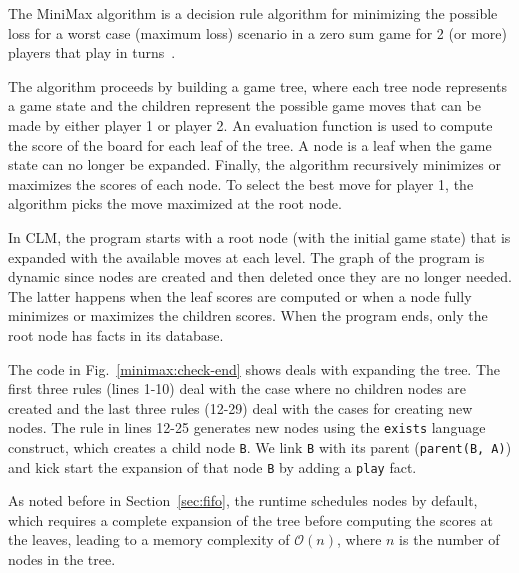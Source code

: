 The MiniMax algorithm is a decision rule algorithm for minimizing the
possible loss for a worst case (maximum loss) scenario in a zero sum
game for 2 (or more) players that play in
turns~\cite{Edwards54}.

The algorithm proceeds by building a game tree, where each tree node represents a
game state and the children represent the possible game moves that can
be made by either player 1 or player 2.
An evaluation function is used to compute the score of
the board for each leaf of the tree. A node is a leaf when the game state can no longer be
expanded. Finally, the
algorithm recursively minimizes or maximizes the scores of each node.
To select the best move for player 1, the
algorithm picks the move maximized at the root node.

In CLM, the program starts with a root node (with the initial game state)
that is expanded with the available moves at each level. The graph of the
program is dynamic since nodes are created and then deleted once they are no
longer needed. The latter happens when the
leaf scores are computed or when a node fully minimizes or maximizes the
children scores. When the program ends, only the root node has facts in its
database.

The code in Fig.~\ref{minimax:check-end} shows deals with expanding the tree.
The first three rules (lines 1-10) deal
with the case where no children nodes are created and the last three rules
(12-29) deal with the cases for creating new nodes.
The rule in lines 12-25 generates new nodes using the
\texttt{exists} language construct, which creates a child node 
\texttt{B}. We link \texttt{B} with its parent (\texttt{parent(B, A)})
and kick start the expansion of that node \texttt{B} by adding a \texttt{play}
fact.

As noted before in Section~\ref{sec:fifo}, the runtime schedules nodes by
default, which requires a complete expansion of the tree before computing the
scores at the leaves, leading
to a memory complexity of $\mathcal{O}(n)$, where $n$ is the number of nodes in
the tree.

